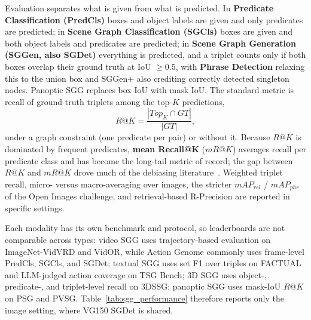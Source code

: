 Evaluation separates what is given from what is predicted. In \textbf{Predicate Classification (PredCls)} boxes and object labels are given and only predicates are predicted; in \textbf{Scene Graph Classification (SGCls)} boxes are given and both object labels and predicates are predicted; in \textbf{Scene Graph Generation (SGGen, also SGDet)} everything is predicted, and a triplet counts only if both boxes overlap their ground truth at IoU $\geq 0.5$, with \textbf{Phrase Detection} relaxing this to the union box and SGGen+ also crediting correctly detected singleton nodes. Panoptic SGG replaces box IoU with mask IoU.
The standard metric is recall of ground-truth triplets among the top-$K$ predictions,
\begin{equation}
    R@K = \frac{|Top_{K} \cap GT|}{|GT|},
\end{equation}
under a graph constraint (one predicate per pair) or without it. Because $R@K$ is dominated by frequent predicates, \textbf{mean Recall@K} ($mR@K$) averages recall per predicate class and has become the long-tail metric of record; the gap between $R@K$ and $mR@K$ drove much of the debiasing literature~\cite{lin2020gps,li2021bipartite,zhou2024hierarchical}. Weighted triplet recall, micro- versus macro-averaging over images, the stricter $mAP_{rel}$ / $mAP_{phr}$ of the Open Images challenge, and retrieval-based R-Precision are reported in specific settings.

Each modality has its own benchmark and protocol, so leaderboards are not comparable across types: video SGG uses trajectory-based evaluation on ImageNet-VidVRD and VidOR, while Action Genome commonly uses frame-level PredCls, SGCls, and SGDet; textual SGG uses set F1 over triples on FACTUAL and LLM-judged action coverage on TSG Bench; 3D SGG uses object-, predicate-, and triplet-level recall on 3DSSG; panoptic SGG uses mask-IoU $R@K$ on PSG and PVSG. Table~\ref{tab:sgg_performance} therefore reports only the image setting, where VG150 SGDet is shared.

